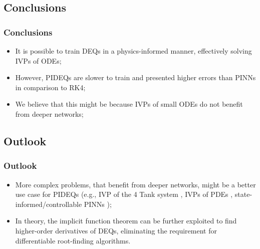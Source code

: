 \documentclass[t]{beamer}
\begin{document}
\subsection{Conclusions}

\begin{frame}
    \frametitle{Conclusions}
    \begin{itemize}[label={\textbullet}]
        \item<1-> It is possible to train DEQs in a physics-informed manner, effectively solving IVPs of ODEs;
	\item<2-> However, PIDEQs are slower to train and presented higher errors than PINNs in comparison to RK4;
	\item<3-> We believe that this might be because IVPs of small ODEs do not benefit from deeper networks;
    \end{itemize}
\end{frame}

\subsection{Outlook}

\begin{frame}
    \frametitle{Outlook}
    \begin{itemize}[label={\textbullet}]
	\item<1-> More complex problems, that benefit from deeper networks, might be a better use case for PIDEQs (e.g., IVP of the 4 Tank system \cite{johansson_quadruple-tank_2000-1}, IVPs of PDEs \cite{Raissi2019}, state-informed/controllable PINNs \cite{Antonelo2021,Arnold2021});
	\item<2-> In theory, the implicit function theorem can be further exploited to find higher-order derivatives of DEQs, eliminating the requirement for differentiable root-finding algorithms.
    \end{itemize}
\end{frame}
\end{document}
